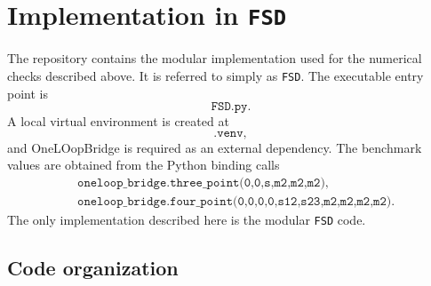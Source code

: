 \documentclass[11pt]{article}
\begin{document}
\section{Implementation in \texttt{FSD}}

The repository contains the modular implementation used for the numerical
checks described above.  It is referred to simply as \texttt{FSD}.  The
executable entry point is
\begin{equation}
  \texttt{FSD.py}.
\end{equation}
A local virtual environment is created at
\begin{equation}
  \texttt{.venv},
\end{equation}
and OneLOopBridge is required as an external dependency.  The benchmark values
are obtained from the Python binding calls
\begin{align}
  &\texttt{oneloop\_bridge.three\_point(0,0,s,m2,m2,m2)},
  \\
  &\texttt{oneloop\_bridge.four\_point(0,0,0,0,s12,s23,m2,m2,m2,m2)}.
\end{align}
The only implementation described here is the modular \texttt{FSD} code.

\subsection{Code organization}
\end{document}
